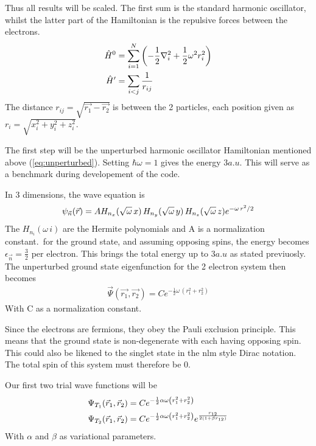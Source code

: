 \documentclass[10pt]{revtex4-1}
\begin{document}
Thus all results will be scaled. The first sum
is the standard harmonic oscillator, whilst the latter part of the Hamiltonian is the repulsive forces between the electrons.
\begin{align}
    \hat{H}^0 &= \sum_{i = 1}^{N} \qty( - \frac{1}{2} \nabla_{i}^{2} + \frac{1}{2} \omega^{2} r_{i}^{2} )\label{eq:unperturbed} \\
    \hat{H}'  &= \sum_{i < j} \frac{1}{r_{i j}} \label{eq:perturbed}
\end{align}
The distance
$r_{ij} = \sqrt{\vec{r_1} - \vec{r_2}}$ is between the 2 particles, each position given as $r_i = \sqrt{ x_i^2 + y_i^2 + z_i^2 }$.

The first step will be the unperturbed harmonic oscillator Hamiltonian mentioned above (\ref{eq:unperturbed}). Setting $\hbar \omega = 1$ gives the energy
$3 a.u$. This will serve as a benchmark during developement of the code.

In 3 dimensions, the wave equation is
\begin{align}
    \psi_{\vec{n}} \qty(\vec{r}) = A H_{n_x}(\sqrt{\omega} \, x )\, H_{n_y}(\sqrt{\omega} \, y )\, H_{n_z}(\sqrt{\omega} \, z )
    e^{-\omega \, r^2 / 2}
\end{align}
The $H_{n_i}(\omega\, i )$ are the Hermite polynomials and A is a normalization constant.\ for the ground state, and assuming opposing spins, the
energy becomes $\epsilon_{\vec{n}} = \frac{3}{2}$ per electron. This brings the total energy up to $3 a.u$ as stated previuosly.
The unperturbed ground state eigenfunction for the 2 electron system then becomes
\begin{align}
    \vec{\Psi}(\vec{r_1}, \vec{r_2} ) = C e^{-\frac{1}{2}\omega \, ( r_1^2 + r_2^2 ) }
\end{align}
With C as a normalization constant.

Since the electrons are fermions, they obey the Pauli exclusion principle. This means that the ground state is
non-degenerate with each having opposing spin. This could also be likened to the singlet state in the nlm style Dirac notation. The total spin of this
system must therefore be 0.

Our first two trial wave functions will be
\begin{align}
    \Psi_{T_1} \qty( \vec{r}_{1}, \vec{r}_{2} ) &= C e^{-\frac{1}{2}\alpha \omega \qty(r_{1}^{2} + r_{2}^{2})}\label{eq:trial1}\\
    \Psi_{T_2} \qty( \vec{r}_{1}, \vec{r}_{2} ) &= C e^{-\frac{1}{2}\alpha \omega \qty(r_{1}^{2} + r_{2}^{2})} e^{\frac{r_{12}}{2\qty(1 + \beta r_{12})}}
    \label{eq:trial2}
\end{align}
With $\alpha$ and $\beta$ as variational parameters.
\end{document}
